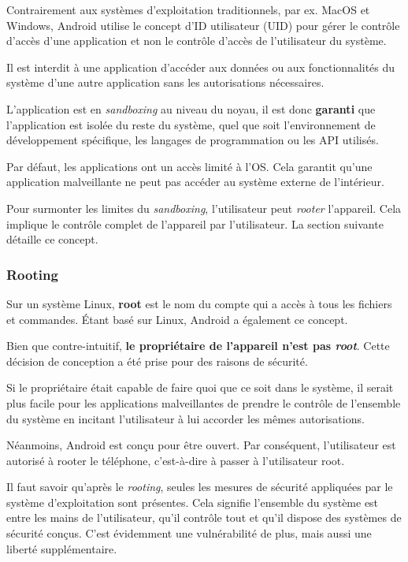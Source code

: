 \documentclass[
  french,
  paper=a4,
  ,captions=tableheading
]{scrartcl}
\begin{document}
Contrairement aux systèmes d'exploitation traditionnels, par ex. MacOS
et Windows, Android utilise le concept d'ID utilisateur (UID) pour gérer
le contrôle d'accès d'une application et non le contrôle d'accès de
l'utilisateur du système.

Il est interdit à une application d'accéder aux données ou aux
fonctionnalités du système d'une autre application sans les
autorisations nécessaires.

L'application est en \emph{sandboxing} au niveau du noyau, il est donc
\textbf{garanti} que l'application est isolée du reste du système, quel
que soit l'environnement de développement spécifique, les langages de
programmation ou les API utilisés.

Par défaut, les applications ont un accès limité à l'OS. Cela garantit
qu'une application malveillante ne peut pas accéder au système externe
de l'intérieur.

Pour surmonter les limites du \emph{sandboxing}, l'utilisateur peut
\emph{rooter} l'appareil. Cela implique le contrôle complet de
l'appareil par l'utilisateur. La section suivante détaille ce concept.

\hypertarget{rooting}{%
\subsubsection{Rooting}\label{rooting}}

Sur un système Linux, \textbf{root} est le nom du compte qui a accès à
tous les fichiers et commandes. Étant basé sur Linux, Android a
également ce concept.

Bien que contre-intuitif, \textbf{le propriétaire de l'appareil n'est
pas \emph{root}}. Cette décision de conception a été prise pour des
raisons de sécurité.

Si le propriétaire était capable de faire quoi que ce soit dans le
système, il serait plus facile pour les applications malveillantes de
prendre le contrôle de l'ensemble du système en incitant l'utilisateur à
lui accorder les mêmes autorisations.

Néanmoins, Android est conçu pour être ouvert. Par conséquent,
l'utilisateur est autorisé à rooter le téléphone, c'est-à-dire à passer
à l'utilisateur root.

Il faut savoir qu'après le \emph{rooting}, seules les mesures de
sécurité appliquées par le système d'exploitation sont présentes. Cela
signifie l'ensemble du système est entre les mains de l'utilisateur,
qu'il contrôle tout et qu'il dispose des systèmes de sécurité conçus. 
C'est évidemment une vulnérabilité de plus, mais aussi une liberté supplémentaire.
\end{document}
